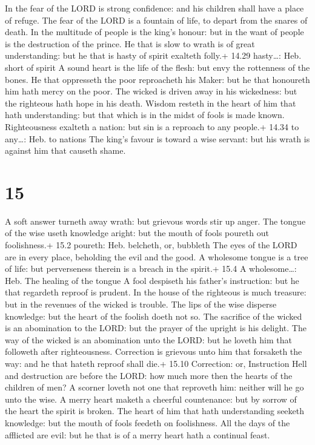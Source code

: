  In the fear of the LORD is strong confidence: and his
children shall have a place of refuge.  The fear of the
LORD is a fountain of life, to depart from the snares of death.
 In the multitude of people is the king's honour: but in
the want of people is the destruction of the prince.  He
that is slow to wrath is of great understanding: but he that is hasty of
spirit exalteth folly.+ 14.29 hasty\ldots: Heb. short of spirit
 A sound heart is the life of the flesh: but envy the
rottenness of the bones.  He that oppresseth the poor
reproacheth his Maker: but he that honoureth him hath mercy on the poor.
 The wicked is driven away in his wickedness: but the
righteous hath hope in his death.  Wisdom resteth in the
heart of him that hath understanding: but that which is in the midst of
fools is made known.  Righteousness exalteth a nation: but
sin is a reproach to any people.+ 14.34 to any\ldots: Heb. to nations
 The king's favour is toward a wise servant: but his wrath
is against him that causeth shame.

\hypertarget{section-14}{%
\section{15}\label{section-14}}

 A soft answer turneth away wrath: but grievous words stir
up anger.  The tongue of the wise useth knowledge aright:
but the mouth of fools poureth out foolishness.+ 15.2 poureth: Heb.
belcheth, or, bubbleth  The eyes of the LORD are in every
place, beholding the evil and the good.  A wholesome tongue
is a tree of life: but perverseness therein is a breach in the spirit.+
15.4 A wholesome\ldots: Heb. The healing of the tongue  A
fool despiseth his father's instruction: but he that regardeth reproof
is prudent.  In the house of the righteous is much treasure:
but in the revenues of the wicked is trouble.  The lips of
the wise disperse knowledge: but the heart of the foolish doeth not so.
 The sacrifice of the wicked is an abomination to the LORD:
but the prayer of the upright is his delight.  The way of
the wicked is an abomination unto the LORD: but he loveth him that
followeth after righteousness.  Correction is grievous unto
him that forsaketh the way: and he that hateth reproof shall die.+ 15.10
Correction: or, Instruction  Hell and destruction are
before the LORD: how much more then the hearts of the children of men?
 A scorner loveth not one that reproveth him: neither will
he go unto the wise.  A merry heart maketh a cheerful
countenance: but by sorrow of the heart the spirit is broken.
 The heart of him that hath understanding seeketh
knowledge: but the mouth of fools feedeth on foolishness. 
All the days of the afflicted are evil: but he that is of a merry heart
hath a continual feast.

